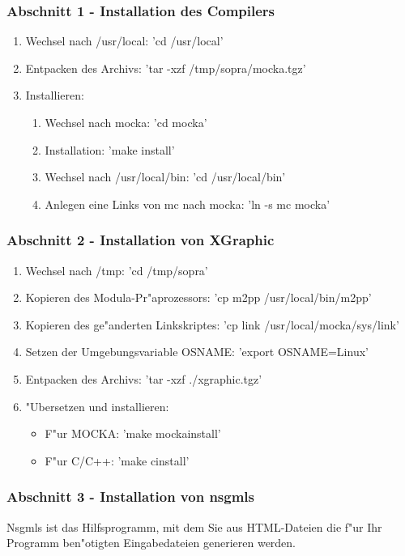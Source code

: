 \subsubsection{Abschnitt 1 - Installation des Compilers}
\begin{enumerate}
\item{Wechsel nach /usr/local: 'cd /usr/local'}
\item{Entpacken des Archivs: 'tar -xzf /tmp/sopra/mocka.tgz'}
\item{Installieren:}
\begin{enumerate}
\item{Wechsel nach mocka: 'cd mocka'}
\item{Installation: 'make install'}
\item{Wechsel nach /usr/local/bin: 'cd /usr/local/bin'}
\item{Anlegen eine Links von mc nach mocka: 'ln -s mc mocka'}
\end{enumerate}
\end{enumerate}

\subsubsection{Abschnitt 2 - Installation von XGraphic}
\begin{enumerate}
\item{Wechsel nach /tmp: 'cd /tmp/sopra'}
\item{Kopieren des Modula-Pr"aprozessors: 'cp m2pp /usr/local/bin/m2pp'}
\item{Kopieren des ge"anderten Linkskriptes: 'cp link /usr/local/mocka/sys/link'}
\item{Setzen der Umgebungsvariable OSNAME: 'export OSNAME=Linux'}
\item{Entpacken des Archivs: 'tar -xzf ./xgraphic.tgz'}
\item{"Ubersetzen und installieren:}
\begin{itemize}
\item{F"ur MOCKA: 'make mockainstall'}
\item{F"ur C/C++: 'make cinstall'}
\end{itemize}
\end{enumerate}

\subsubsection{Abschnitt 3 - Installation von nsgmls}
Nsgmls ist das Hilfsprogramm, mit dem Sie aus HTML-Dateien die f"ur
Ihr Programm ben"otigten Eingabedateien generieren werden.

